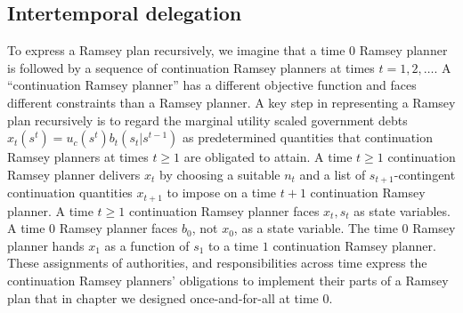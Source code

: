 %




\subsection{Intertemporal delegation}
  To express a Ramsey plan recursively,
we  imagine that  a time $0$ Ramsey planner is followed by a sequence of continuation Ramsey planners at times
$t = 1, 2, \ldots$. A ``continuation Ramsey planner''  has a different objective function and faces
different constraints than a Ramsey planner.
A key step in representing a Ramsey plan recursively is
 to regard the marginal utility scaled government debts $x_t(s^t) = u_c(s^t) b_t(s_t|s^{t-1})$  as  predetermined quantities
 that   continuation Ramsey planners at times $t \geq 1$ are obligated to attain.
 A time $t\geq 1$ continuation Ramsey planner  delivers $x_t$  by choosing a suitable $n_t$ and a list of $s_{t+1}$-contingent
continuation quantities $x_{t+1}$ to impose on   a time $t+1$ continuation Ramsey planner. A time $t \geq 1$ continuation Ramsey
planner faces $x_t, s_t$ as state variables.
A time $0$ Ramsey planner faces $b_0$,
not $x_0$, as a state variable. 
The time $0$ Ramsey planner hands $x_1$ as a function of $s_1$  to a time
$1$ continuation Ramsey planner.
These assignments of  
authorities, and responsibilities across time    express the continuation Ramsey planners' obligations to
implement their parts of  a  Ramsey plan that in chapter   we  designed  once-and-for-all  at time $0$.





